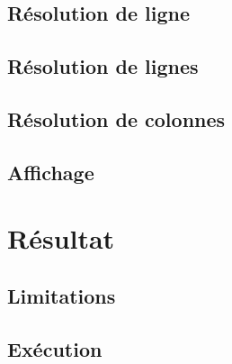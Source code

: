 \documentclass{article}
\begin{document}
\subsection{Résolution de ligne}
\subsection{Résolution de lignes}
\subsection{Résolution de colonnes}
\subsection{Affichage}
\section{Résultat}
\subsection{Limitations}
\subsection{Exécution}
\end{document}
